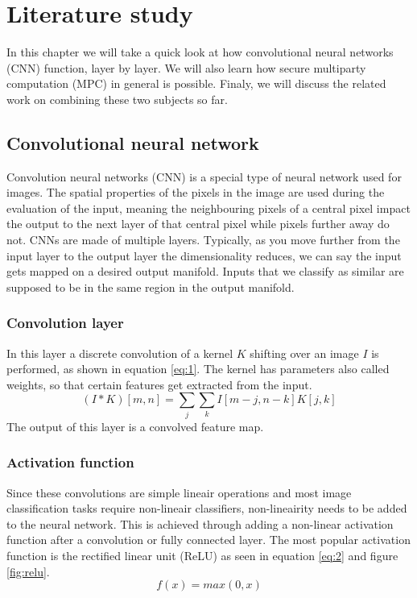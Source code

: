 
\chapter{Literature study}
In this chapter we will take a quick look at how convolutional neural networks (CNN) function, layer by layer. We will also learn how secure multiparty computation (MPC) in general is possible. Finaly, we will discuss the related work on combining these two subjects so far.

\section{Convolutional neural network}
Convolution neural networks (CNN) is a special type of neural network used for images. The spatial properties of the pixels in the image are used during the evaluation of the input, meaning the neighbouring pixels of a central pixel impact the output to the next layer of that central pixel while pixels further away do not.
CNNs are made of multiple layers. Typically, as you move further from the input layer to the output layer the dimensionality reduces, we can say the input gets mapped on a desired output manifold. Inputs that we classify as similar are supposed to be in the same region in the output manifold.

\subsection{Convolution layer}
In this layer a discrete convolution of a kernel $K$ shifting over an image $I$ is performed, as shown in equation \ref{eq:1}. The kernel has parameters also called weights, so that certain features get extracted from the input.
\begin{equation} \label{eq:1}
  (I*K)[m,n]=\sum_j\sum_k I[m-j,n-k]K[j,k]
\end{equation}
The output of this layer is a convolved feature map.

\subsection{Activation function}
Since these convolutions are simple lineair operations and most image classification tasks require non-lineair classifiers, non-lineairity needs to be added to the neural network. This is achieved through adding a non-linear activation function after a convolution or fully connected layer. The most popular activation function is the rectified linear unit (ReLU) as seen in equation \ref{eq:2} and figure \ref{fig:relu}.
\begin{equation} \label{eq:2}
  f(x)=max(0,x)
\end{equation}

